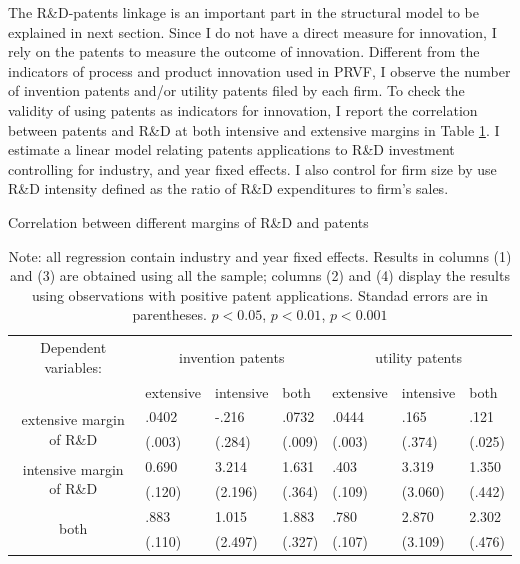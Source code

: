 \documentclass[English]{article}
\begin{document}
The R\&D-patents linkage is an important part in the structural model to be explained in next section. Since I do not have a direct measure for innovation, I rely on the patents to measure the outcome of innovation. Different from the indicators of process and product innovation used in PRVF, I observe the number of invention patents and/or utility patents filed by each firm. To check the validity of using patents as indicators for innovation, I report the correlation between patents and R\&D at both intensive and extensive margins in Table \ref{T4}. I estimate a linear model relating patents applications to R\&D investment controlling for industry, and year fixed effects. I also control for firm size by use R\&D intensity defined as the ratio of R\&D expenditures to firm's sales. 

\begin{table}[H]
\centering
\caption{Correlation between different margins of R\&D and patents}
\label{T4}
\begin{tabular}{cllllll}
\hline\hline
                                         Dependent variables: & \multicolumn{3}{c}{invention patents} & \multicolumn{3}{c}{utility patents} \\
                                          & extensive   & intensive  & both       & extensive  & intensive  & both      \\
                                          \hline 
\multirow{2}{*}{extensive margin of R\&D} & .0402\sym{***}   & -.216     & .0732\sym{***}  & .0444\sym{***}  & .165      & .121\sym{***}  \\
                                          & (.003)     & (.284)    & (.009)    & (.003)    & (.374)    & (.025)   \\
                                          \hline
\multirow{2}{*}{intensive margin of R\&D} & 0.690\sym{***}    & 3.214      & 1.631\sym{***}   & .403\sym{***}   & 3.319      & 1.350\sym{**}   \\
                                          & (.120)     & (2.196)    & (.364)    & (.109)    & (3.060)    & (.442)   \\
 \hline
\multirow{2}{*}{both}                     & .883\sym{***}   & 1.015      & 1.883\sym{***}   & .780\sym{***}  & 2.870      & 2.302\sym{***}  \\
                                          & (.110)     & (2.497)    & (.327)    & (.107)    & (3.109)    & (.476)  \\
\hline\hline
\end{tabular}
\caption*{\small{}Note: all regression contain industry and year fixed effects. Results in columns (1) and (3) are obtained using all the sample; columns (2) and (4) display the results using observations with positive patent applications. Standad errors are in parentheses.\sym{*} \(p<0.05\), \sym{**} \(p<0.01\), \sym{***} \(p<0.001\)} {\small \par}
\end{table}
\end{document}
